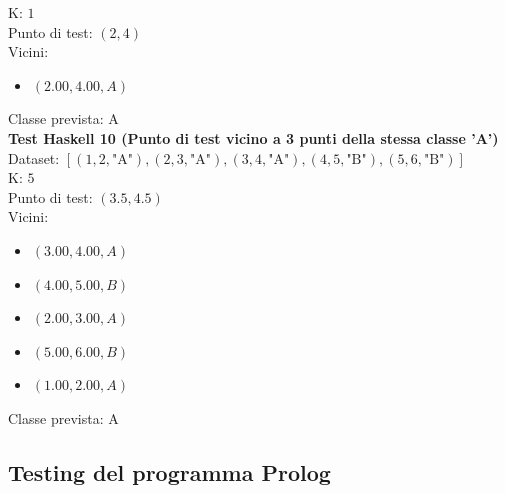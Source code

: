 \documentclass[11pt]{article}
\theoremstyle{definition}
\begin{document}
K: $1$\\
Punto di test: $(2, 4)$\\
Vicini:
\begin{itemize}
\item $(2.00,4.00, A)$
\end{itemize}
Classe prevista: A\\
\newline
\textbf{Test Haskell 10 (Punto di test vicino a 3 punti della stessa classe 'A')}\\
Dataset: $[(1, 2, \text{"A"}), (2, 3, \text{"A"}), (3, 4, \text{"A"}), (4, 5, \text{"B"}), (5, 6, \text{"B"})]$\\
K: $5$\\
Punto di test: $(3.5, 4.5)$\\
Vicini:
\begin{itemize}
\item $(3.00,4.00,A)$
\item $(4.00,5.00,B)$
\item $(2.00,3.00,A)$
\item $(5.00,6.00,B)$
\item $(1.00,2.00,A)$
\end{itemize}
Classe prevista: A

\newpage

\subsection{Testing del programma Prolog}
\end{document}
